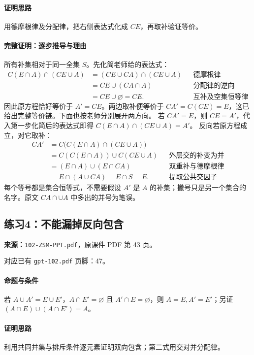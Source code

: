 \paragraph{证明思路}用德摩根律及分配律，把右侧表达式化成 $CE$，再取补验证等价。
\paragraph{完整证明：逐步推导与理由}

所有补集相对于同一全集 $S$。先化简老师给的表达式：
\begin{align*}
C(E\cap A)\cap(CE\cup A)
&=(CE\cup CA)\cap(CE\cup A)&&\text{德摩根律}\\
&=CE\cup(CA\cap A)&&\text{分配律的逆向}\\
&=CE\cup\varnothing=CE.&&\text{互补及空集恒等律}
\end{align*}
因此原方程恰好等价于 $A'=CE$。两边取补便等价于 $CA'=C(CE)=E$，这已给出完整等价链。下面也按老师分别展开两方向。
若 $CA'=E$，则 $CE=A'$，代入第一步化简后的表达式即得 $C(E\cap A)\cap(CE\cup A)=A'$。
反向若原方程成立，对它取补：
\begin{align*}
CA'&=C\big(C(E\cap A)\cap(CE\cup A)\big)\\
&=C(C(E\cap A))\cup C(CE\cup A)&&\text{外层交的补变为并}\\
&=(E\cap A)\cup(E\cap CA)&&\text{双重补与德摩根律}\\
&=E\cap(A\cup CA)=E\cap S=E.&&\text{提取公共交因子}
\end{align*}
每个等号都是集合恒等式，不需要假设 $A'$ 是 $A$ 的补集；撇号只是另一个集合的名字。原文 $CA\cap\cup A$ 中多出的并号为笔误。

\clearpage\subsection{练习4：不能漏掉反向包含}
\textbf{来源：}\texttt{102-ZSM-PPT.pdf}，原课件 PDF 第 43 页。\par
对应已有 \texttt{gpt-102.pdf} 页脚：47。\par
\paragraph{命题与条件}若 $A\cup A'=E\cup E'$，$A\cap E'=\varnothing$ 且 $A'\cap E=\varnothing$，则 $A=E,A'=E'$；另证 $(A\cap E)\cup(A\cap E')=A$。
\paragraph{证明思路}利用共同并集与排斥条件逐元素证明双向包含；第二式用交对并分配律。
